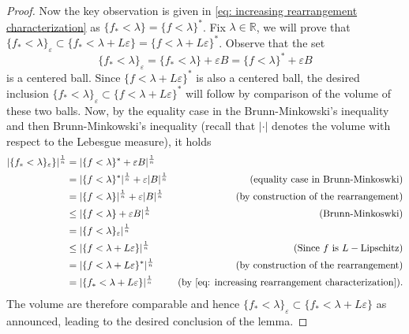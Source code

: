 \documentclass[11pt]{article}
\newcommand{\1}{[1]}
\begin{document}
\begin{proof}
Now the key observation is given in \eqref{eq: increasing rearrangement characterization} as $\{f_* < \lambda\}=\{f<\lambda\}^*$. Fix $\lambda \in \mathbb{R}$, we will prove that 
$\{f_* < \lambda\}_\varepsilon \subset \{f_* < \lambda +L\varepsilon\}=\{f < \lambda +L\varepsilon\}^*$.
Observe that the set 
$$
\{f_* < \lambda\}_\varepsilon =
\{f_* < \lambda\} + \varepsilon B
=
\{f < \lambda\}^* + \varepsilon B
$$ 
is a centered ball. Since  $\{f < \lambda +L\varepsilon\}^*$ is also a centered ball, the desired inclusion 
$\{f_* < \lambda\}_\varepsilon \subset \{f < \lambda +L\varepsilon\}^*$ will follow by comparison of the volume of these two balls. Now, by the equality case in the Brunn-Minkowski's inequality and then Brunn-Minkowski's inequality (recall that $|\cdot|$ denotes the volume with respect to the Lebesgue measure), it holds
\begin{align*}
|\{ f_* < \lambda\}_\varepsilon \}|^\frac{1}{n} 
& = |\{ f < \lambda\}^* + \varepsilon B |^\frac{1}{n} \\\
& = 
|\{ f < \lambda\}^*|^\frac{1}{n} + \varepsilon |B|^\frac{1}{n} & \mbox{(equality case in Brunn-Minkoswki)} \\
& 
=
|\{ f < \lambda\}|^\frac{1}{n} + \varepsilon |B|^\frac{1}{n}  & \mbox{(by construction of the rearrangement)} \\
& \leq 
|\{ f < \lambda\}+ \varepsilon B|^\frac{1}{n} & \mbox{(Brunn-Minkoswki)} \\
&= 
|\{ f < \lambda\}_\varepsilon|^\frac{1}{n} \\
& \leq 
|\{ f < \lambda+L\varepsilon\}|^\frac{1}{n}
& \mbox{(Since } f \mbox{ is } L-\mbox{Lipschitz)} \\
& =
|\{ f < \lambda+L\varepsilon\}^*|^\frac{1}{n} & \mbox{(by construction of the rearrangement)} \\
& =
|\{ f_* < \lambda+L\varepsilon\}|^\frac{1}{n}
& \mbox{(by \eqref{eq: increasing rearrangement characterization})}.
\end{align*}
The volume are therefore comparable and hence $\{f_* < \lambda\}_\varepsilon \subset \{f_* < \lambda +L\varepsilon\}$ as announced, leading to the desired conclusion of the lemma. 
\end{proof}
\end{document}
